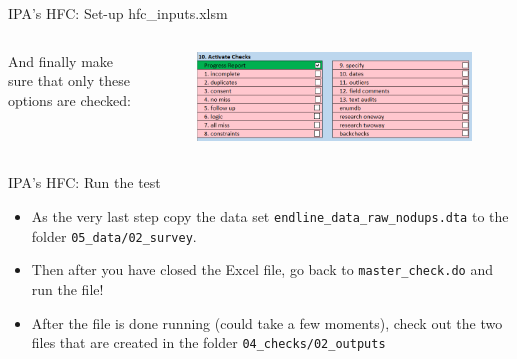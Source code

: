 \documentclass[aspectratio=169]{beamer}
\begin{document}
\begin{frame}{IPA's HFC: Set-up hfc\_inputs.xlsm}
	\begin{columns}[c]
		
		\small And finally make sure that only these options are checked:
		
		\begin{figure}
			\centering
			\includegraphics[width=\linewidth]{img/ipacheck-setup-4.png}
		\end{figure}
	\end{columns}
\end{frame}

\begin{frame}{IPA's HFC: Run the test}

	\begin{itemize}
		\item As the very last step copy the data set \texttt{endline\_data\_raw\_nodups.dta} to the folder \texttt{05\_data/02\_survey}. 
		\item Then after you have closed the Excel file, go back to \texttt{master\_check.do} and run the file!
		\item After the file is done running (could take a few moments), check out the two files that are created in the folder \texttt{04\_checks/02\_outputs}
	\end{itemize}
\end{frame}
\end{document}
